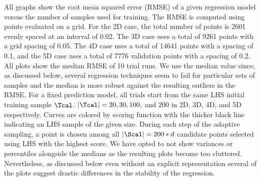 All graphs show the root mean squared error (RMSE) of a given regression model versus the number of samples used for training.
%
The RMSE is computed using points evaluated on a grid.
%
For the 2D case, the total number of points is 2601 evenly spaced at an interval of 0.02.
%
The 3D case uses a total of 9261 points with a grid spacing of 0.05.
%
The 4D case uses a total of 14641 points with a spacing of 0.1, and the 5D case uses a total of 7776 validation points with a spacing of 0.2.
%
All plots show the median RMSE of 10 trial runs.
%
We use the median value since, as discussed below, several regression techniques seem to fail for particular sets of samples and the median is more robust against the resulting outliers in the RMSE.
%
For a fixed prediction model, all trials start from the same LHS initial training sample $\Tcal$.
%
$|\Tcal| = 20, 30, 100,$ and $200$ in 2D, 3D, 4D, and 5D respectively.
%
Curves are colored by scoring function with the thicker black line indicating an LHS sample of the given size.
%
During each step of the adaptive sampling, a point is chosen among all $|\Scal| =
200*d$ candidate points selected using LHS with the highest score.
%
We have opted to not show variances or percentiles alongside the medians as the resulting plots become too cluttered.
%
Nevertheless, as discussed below even without an explicit representation several of the plots suggest drastic differences in the stability of the regression.


